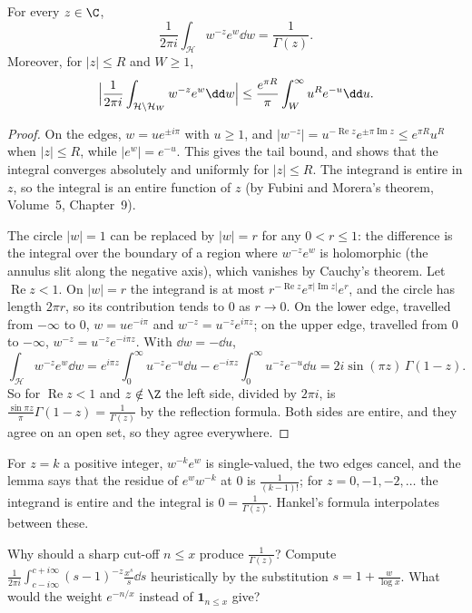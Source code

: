 \begin{lemma}[Hankel, 1864]\label{lem:hankel}
For every $z\in\C$,
\[
\frac1{2\pi i}\int_{\mathcal H}w^{-z}e^w\dd w=\frac1{\Gamma(z)}.
\]
Moreover, for $|z|\le R$ and $W\ge1$,
\[
\Bigl|\frac1{2\pi i}\int_{\mathcal H\setminus\mathcal H_W}w^{-z}e^w\dd w\Bigr|\le\frac{e^{\pi R}}\pi\int_W^\infty u^Re^{-u}\dd u.
\]
\end{lemma}
\begin{proof}
On the edges, $w=ue^{\pm i\pi}$ with $u\ge1$, and $|w^{-z}|=u^{-\operatorname{Re}z}e^{\pm\pi\operatorname{Im}z}\le e^{\pi R}u^R$ when $|z|\le R$, while $|e^w|=e^{-u}$. This gives the tail bound, and shows that the integral converges absolutely and uniformly for $|z|\le R$. The integrand is entire in $z$, so the integral is an entire function of $z$ (by Fubini and Morera's theorem, Volume~5, Chapter~9).

The circle $|w|=1$ can be replaced by $|w|=r$ for any $0<r\le1$: the difference is the integral over the boundary of a region where $w^{-z}e^w$ is holomorphic (the annulus slit along the negative axis), which vanishes by Cauchy's theorem. Let $\operatorname{Re}z<1$. On $|w|=r$ the integrand is at most $r^{-\operatorname{Re}z}e^{\pi|\operatorname{Im}z|}e^r$, and the circle has length $2\pi r$, so its contribution tends to $0$ as $r\to0$. On the lower edge, travelled from $-\infty$ to $0$, $w=ue^{-i\pi}$ and $w^{-z}=u^{-z}e^{i\pi z}$; on the upper edge, travelled from $0$ to $-\infty$, $w^{-z}=u^{-z}e^{-i\pi z}$. With $\dd w=-\dd u$,
\[
\int_{\mathcal H}w^{-z}e^w\dd w=e^{i\pi z}\int_0^\infty u^{-z}e^{-u}\dd u-e^{-i\pi z}\int_0^\infty u^{-z}e^{-u}\dd u=2i\sin(\pi z)\,\Gamma(1-z).
\]
So for $\operatorname{Re}z<1$ and $z\notin\Z$ the left side, divided by $2\pi i$, is $\frac{\sin\pi z}\pi\Gamma(1-z)=\frac1{\Gamma(z)}$ by the reflection formula. Both sides are entire, and they agree on an open set, so they agree everywhere.
\end{proof}

For $z=k$ a positive integer, $w^{-k}e^w$ is single-valued, the two edges cancel, and the lemma says that the residue of $e^ww^{-k}$ at $0$ is $\frac1{(k-1)!}$; for $z=0,-1,-2,\dots$ the integrand is entire and the integral is $0=\frac1{\Gamma(z)}$. Hankel's formula interpolates between these.

\begin{think}
Why should a sharp cut-off $n\le x$ produce $\frac1{\Gamma(z)}$? Compute $\frac1{2\pi i}\int_{c-i\infty}^{c+i\infty}(s-1)^{-z}\frac{x^s}s\dd s$ heuristically by the substitution $s=1+\frac w{\log x}$. What would the weight $e^{-n/x}$ instead of $\mathbf 1_{n\le x}$ give?
\end{think}

